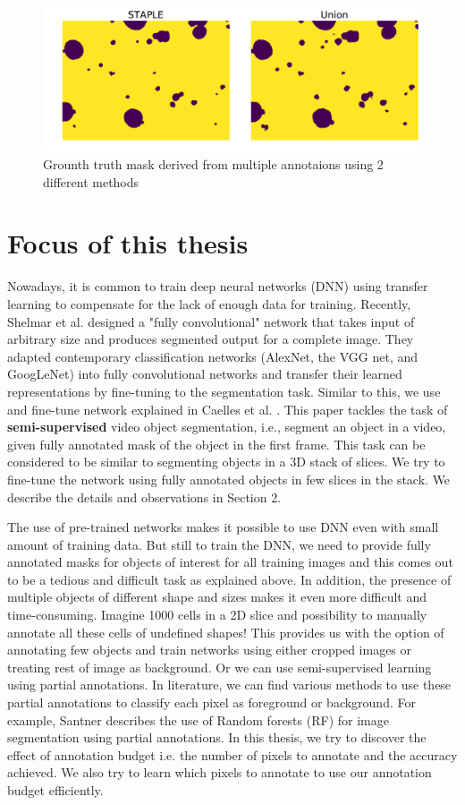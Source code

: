 \begin{figure}[] \label{fig:ref}
\centering
 \includegraphics[width=0.7\linewidth]{figures/staple.pdf}
\caption{Grounth truth mask derived from multiple annotaions using 2 different methods}
\end{figure}

\section{Focus of this thesis}
Nowadays, it is common to train deep neural networks (DNN) using transfer learning to compensate for the lack of enough data for training. Recently, Shelmar et al. \cite{long:2014} designed a "fully convolutional" network that takes input of arbitrary size and produces segmented output for a complete image. They adapted contemporary classification networks (AlexNet, the VGG net, and GoogLeNet) into fully convolutional networks and transfer their learned representations by fine-tuning to the segmentation task. Similar to this, we use and fine-tune network explained in Caelles et al. \cite{osvos}. This paper tackles the task of \textbf{semi-supervised} video object segmentation, i.e., segment an object in a video, given fully annotated mask of the object in the first frame. This task can be considered to be similar to segmenting objects in a 3D stack of slices. We try to fine-tune the network using fully annotated objects in few slices in the stack. We describe the details and observations in Section 2.

The use of pre-trained networks makes it possible to use DNN even with small amount of training data. But still to train the DNN, we need to provide fully annotated masks for objects of interest for all training images and this comes out to be a tedious and difficult task as explained above. In addition, the presence of multiple objects of different shape and sizes makes it even more difficult and time-consuming. Imagine 1000 cells in a 2D slice and possibility to manually annotate all these cells of undefined shapes! This provides us with the option of annotating few objects and train networks using either cropped images or treating rest of image as background. Or we can use semi-supervised learning using partial annotations. In literature, we can find various methods to use these partial annotations to classify each pixel as foreground or background. For example, Santner \cite{santner:2009} describes the use of Random forests (RF) for image segmentation using partial annotations. In this thesis, we try to discover the effect of annotation budget i.e. the number of pixels to annotate and the accuracy achieved. We also try to learn which pixels to annotate to use our annotation budget efficiently. 

